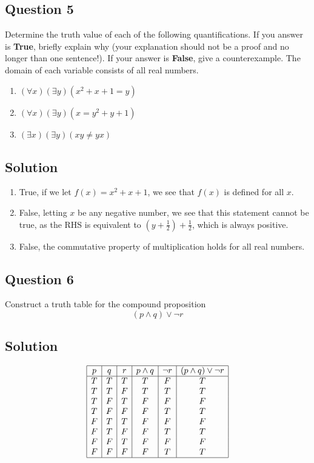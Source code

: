 \documentclass{article}
\begin{document}
\subsection*{Question 5}
    Determine the truth value of each of the following quantifications. If you answer is \textbf{True}, briefly explain why (your explanation should not be a proof and no longer than one sentence!). If your answer is \textbf{False}, give a counterexample. The domain of each variable consists of all real numbers.
    \begin{enumerate}
        \item $(\forall x)(\exists y)(x^2 + x + 1 = y)$
        \item $(\forall x)(\exists y)(x = y^2 + y + 1)$
        \item $(\exists x)(\exists y)(xy \ne yx)$
    \end{enumerate}

\subsection*{Solution}
    \begin{enumerate}
        \item True, if we let $f(x) = x^2 + x + 1$, we see that $f(x)$ is defined for all $x$. 
        \item False, letting $x$ be any negative number, we see that this statement cannot be true, as the RHS is equivalent to $(y + \frac{1}{2}) + \frac{1}{2}$, which is always positive.
        \item False, the commutative property of multiplication holds for all real numbers.
    \end{enumerate}

\subsection*{Question 6}
    Construct a truth table for the compound proposition $$(p \land q) \lor \neg r$$

\subsection*{Solution}
    $$\begin{array}{|c|c|c|c|c|c|}
        \hline
        p & q & r & p \land q & \neg r & (p \land q) \lor \neg r \\
        \hline
        T & T & T & T & F & T \\
        T & T & F & T & T & T \\
        T & F & T & F & F & F \\
        T & F & F & F & T & T \\
        F & T & T & F & F & F \\
        F & T & F & F & T & T \\
        F & F & T & F & F & F \\
        F & F & F & F & T & T \\
        \hline
    \end{array}$$
\end{document}
